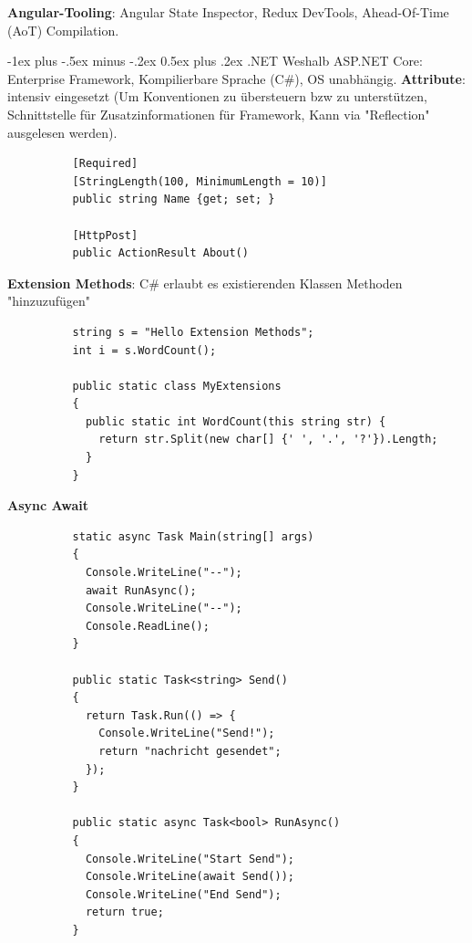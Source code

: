 \documentclass[10pt,landscape]{article}
\makeatletter
\renewcommand{\section}{\@startsection{section}{1}{0mm}%
{-1ex plus -.5ex minus -.2ex}%
{0.5ex plus .2ex}%
{\normalfont\large\bfseries}}
\makeatother
\begin{document}
\begin{multicols}{2}
        \textbf{Angular-Tooling}: Angular State Inspector, Redux DevTools, Ahead-Of-Time (AoT) Compilation.

        \section{.NET}
        Weshalb ASP.NET Core: Enterprise Framework, Kompilierbare Sprache (C\#), OS unabhängig.
        \textbf{Attribute}: intensiv eingesetzt (Um Konventionen zu übersteuern bzw zu unterstützen, Schnittstelle für Zusatzinformationen für Framework, Kann via "Reflection" ausgelesen werden).
        \begin{lstlisting}
          [Required]
          [StringLength(100, MinimumLength = 10)]
          public string Name {get; set; }

          [HttpPost]
          public ActionResult About()
        \end{lstlisting}

        \textbf{Extension Methods}: C\# erlaubt es existierenden Klassen Methoden "hinzuzufügen"
        \begin{lstlisting}
          string s = "Hello Extension Methods";
          int i = s.WordCount();

          public static class MyExtensions
          {
            public static int WordCount(this string str) {
              return str.Split(new char[] {' ', '.', '?'}).Length;
            }
          }
        \end{lstlisting}

        \textbf{Async Await}
        \begin{lstlisting}
          static async Task Main(string[] args)
          {
            Console.WriteLine("--");
            await RunAsync();
            Console.WriteLine("--");
            Console.ReadLine();
          }

          public static Task<string> Send()
          {
            return Task.Run(() => {
              Console.WriteLine("Send!");
              return "nachricht gesendet";
            });
          }

          public static async Task<bool> RunAsync()
          {
            Console.WriteLine("Start Send");
            Console.WriteLine(await Send());
            Console.WriteLine("End Send");
            return true;
          }


\end{lstlisting}
\end{multicols}
\end{document}
